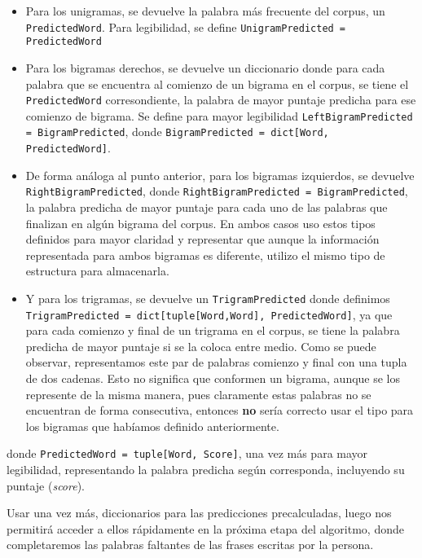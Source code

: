 \documentclass[a4paper]{article}
\begin{document}
\begin{itemize}
    \item Para los unigramas, se devuelve la palabra más frecuente del corpus, un \texttt{PredictedWord}. Para legibilidad, se define \texttt{UnigramPredicted = PredictedWord}
    \item Para los bigramas derechos, se devuelve un diccionario donde para cada palabra que se encuentra al comienzo de un bigrama en el corpus, se tiene el \texttt{PredictedWord} corresondiente, la palabra de mayor puntaje predicha para ese comienzo de bigrama. Se define para mayor legibilidad \texttt{LeftBigramPredicted = BigramPredicted}, donde \texttt{BigramPredicted = dict[Word, PredictedWord]}.
    \item De forma análoga al punto anterior, para los bigramas izquierdos, se devuelve \texttt{Right\linebreak{}BigramPredicted}, donde \texttt{RightBigramPredicted = BigramPredicted}, la palabra predicha de mayor puntaje para cada uno de las palabras que finalizan en algún bigrama del corpus. En ambos casos uso estos tipos definidos para mayor claridad y representar que aunque la información representada para ambos bigramas es diferente, utilizo el mismo tipo de estructura para almacenarla.
    \item Y para los trigramas, se devuelve un \texttt{TrigramPredicted} donde definimos \texttt{TrigramPredicted = dict[tuple[Word,Word], PredictedWord]}, ya que para cada comienzo y final de un trigrama en el corpus, se tiene la palabra predicha de mayor puntaje si se la coloca entre medio. Como se puede observar, representamos este par de palabras comienzo y final con una tupla de dos cadenas. Esto no significa que conformen un bigrama, aunque se los represente de la misma manera, pues claramente estas palabras no se encuentran de forma consecutiva, entonces \textbf{no} sería correcto usar el tipo para los bigramas que habíamos definido anteriormente.
\end{itemize}

\noindent donde \texttt{PredictedWord = tuple[Word, Score]}, una vez más para mayor legibilidad, representando la palabra predicha según corresponda, incluyendo su puntaje (\textit{score}).

Usar una vez más, diccionarios para las predicciones precalculadas, luego nos permitirá acceder a ellos rápidamente en la próxima etapa del algoritmo, donde completaremos las palabras faltantes de las frases escritas por la persona.
\end{document}
